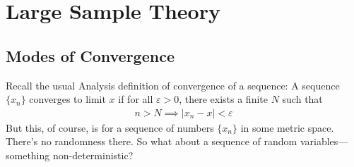 \documentclass[12pt]{article}
\theoremstyle{plain}
\theoremstyle{definition}
\theoremstyle{remark}
\begin{document}




\clearpage
\section{Large Sample Theory}


\subsection{Modes of Convergence}

Recall the usual Analysis definition of convergence of a sequence: A
sequence $\{x_n\}$ converges to limit $x$ if for all $\varepsilon> 0$,
there exists a finite $N$ such that
\begin{align*}
  n > N \implies |x_n - x| < \varepsilon
\end{align*}
But this, of course, is for a sequence of numbers $\{x_n\}$ in some
metric space. There's no randomness there. So what about a sequence of
random variables---something non-deterministic?
\end{document}
